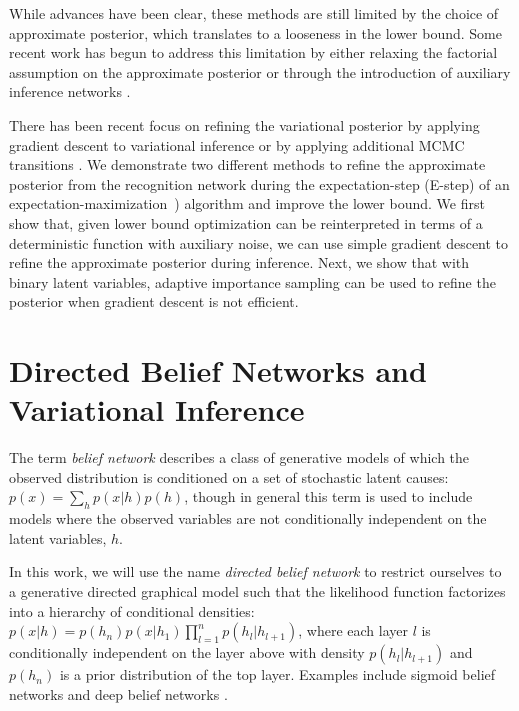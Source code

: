 \documentclass{article} %
\begin{document}
While advances have been clear, these methods are still limited by the choice
of approximate posterior, which translates to a looseness in the lower bound.
Some recent work has begun to address this limitation by either relaxing the
factorial assumption \citep{burda2015importance} on the approximate posterior or
through the introduction of auxiliary inference networks
\citep{rezende2015variational}. 

There has been recent focus on
refining the variational posterior by applying gradient descent to variational
inference \citep{hoffman2013stochastic} or by applying additional MCMC
transitions \citep{salimans2014markov}. We demonstrate two different methods to
refine the approximate posterior from the recognition network during the expectation-step (E-step)
of an expectation-maximization~\citep[EM,][]{dempster1977maximum, neal1998view}) algorithm and improve the lower bound. 
We first show that, given lower bound optimization can be
reinterpreted in terms of a deterministic function with auxiliary noise, we can use simple gradient descent
to refine the approximate posterior during inference. Next, we show that with
binary latent variables, adaptive importance sampling
\citep[AdIS][]{karamchandani1989adaptive} can be used to refine the posterior when gradient descent is not efficient.

\section{Directed Belief Networks and Variational Inference}

The term \emph{belief network} describes a class of generative models of which
the observed distribution is conditioned on a set of stochastic latent causes:
$p(x) = \sum_h p(x|h) p(h)$, though in general this term is used to include
models where the observed variables are not conditionally independent on the
latent variables, $h$. 

In this work, we will use the name \emph{directed belief network} to restrict
ourselves to a generative directed graphical model such that the likelihood
function factorizes into a hierarchy of conditional densities: $p(x | h) =
p(h_n) p(x|h_1) \prod_{l=1}^n p(h_{l}|h_{l+1})$, where each layer $l$ is
conditionally independent on the layer above with density $p(h_{l}|h_{l + 1})$
and $p(h_n)$ is a prior distribution of the top layer. Examples include sigmoid
belief networks \citep[SBN,][]{neal1992connectionist} and deep belief networks
\citep[DBN,][]{hinton2006fast}.
\end{document}
